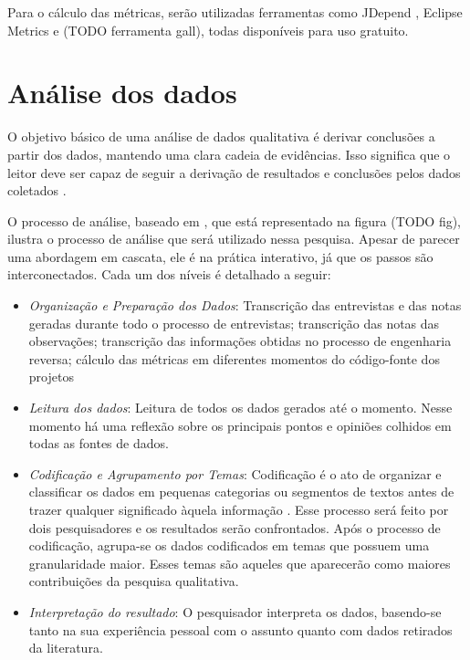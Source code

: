 Para o cálculo das métricas, serão utilizadas ferramentas como JDepend \cite{jdepend}, Eclipse Metrics \cite{eclipse-metrics} e (TODO ferramenta gall),
todas disponíveis para uso gratuito.

\section{Análise dos dados}
\label{sec:planejamento-analise}

O objetivo básico de uma análise de dados qualitativa é derivar conclusões a partir dos dados, mantendo uma clara cadeia de evidências.
Isso significa que o leitor deve ser capaz de seguir a derivação de resultados e conclusões pelos dados coletados \cite{yin}.

O processo de análise, baseado em \cite{creswell}, que está representado na figura (TODO fig), ilustra o processo de análise que será utilizado nessa pesquisa. Apesar de parecer uma abordagem em cascata, ele é na prática interativo, já que os passos são interconectados. Cada um dos níveis é detalhado a seguir:

\begin{itemize}

	\item \textit{Organização e Preparação dos Dados}: Transcrição das entrevistas e das notas geradas durante todo o processo de entrevistas; transcrição das notas das observações; transcrição das informações obtidas no processo de engenharia reversa; cálculo das métricas em diferentes momentos do código-fonte dos projetos
	
	\item \textit{Leitura dos dados}: Leitura de todos os dados gerados até o momento. Nesse momento há uma reflexão sobre os principais pontos e opiniões colhidos em todas as fontes de dados.
	
	\item \textit{Codificação e Agrupamento por Temas}:	Codificação é o ato de organizar e classificar os dados em pequenas categorias ou segmentos de textos antes de trazer qualquer significado àquela informação \cite{rossman}. Esse processo será feito por dois pesquisadores e os resultados serão confrontados. Após o processo de codificação, agrupa-se os dados codificados em temas que possuem uma granularidade maior. Esses temas são aqueles que aparecerão como maiores contribuições da pesquisa qualitativa.
	
	\item \textit{Interpretação do resultado}: O pesquisador interpreta os dados, basendo-se tanto na sua experiência pessoal com o assunto quanto com dados retirados da literatura.

\end{itemize}
 
